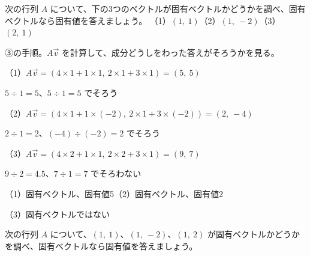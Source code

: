 
\begin{reidai}[固有ベクトルかどうかを確かめる]
次の行列 $A$ について、下の3つのベクトルが固有ベクトルかどうかを調べ、固有ベクトルなら固有値を答えましょう。
（1）$(1,\ 1)$\qquad（2）$(1,\ -2)$\qquad（3）$(2,\ 1)$\par
\kangaekata ③の手順。$A\vec v$ を計算して、成分どうしをわった答えがそろうかを見る。\par
\shiki\kviiis{}\zw{} （1）$A\vec v=(4\times1+1\times1,\ 2\times1+3\times1)=(5,\ 5)$\par
\kviiib $5\div1=5$、$5\div1=5$ でそろう\par
\kviiia （2）$A\vec v=(4\times1+1\times(-2),\ 2\times1+3\times(-2))=(2,\ -4)$\par
\kviiib $2\div1=2$、$(-4)\div(-2)=2$ でそろう\par
\kviiia （3）$A\vec v=(4\times2+1\times1,\ 2\times2+3\times1)=(9,\ 7)$\par
\kviiib $9\div2=4.5$、$7\div1=7$ でそろわない\par
\kotae\kviiis{}\zw{} （1）固有ベクトル、固有値5\quad （2）固有ベクトル、固有値2\par
\kviiia （3）固有ベクトルではない
\end{reidai}

\begin{jibun}
次の行列 $A$ について、$(1,\ 1)$、$(1,\ -2)$、$(1,\ 2)$ が固有ベクトルかどうかを調べ、固有ベクトルなら固有値を答えましょう。
\end{jibun}

